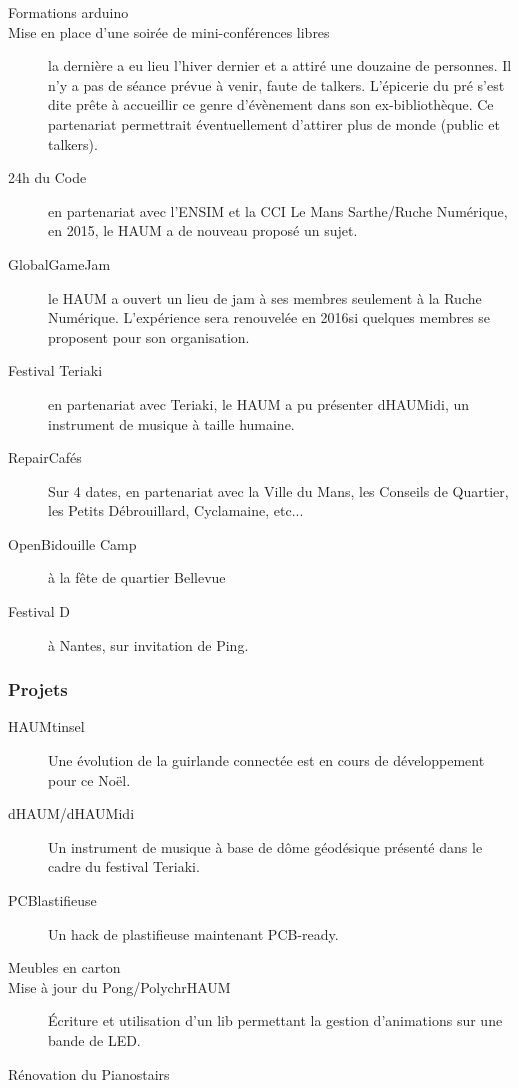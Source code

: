 \documentclass[11pt]{article}
\begin{document}
\begin{description}
    \item[Formations arduino]
    \item[Mise en place d'une soirée de mini-conférences libres] la dernière a eu lieu l'hiver dernier et a attiré une
		douzaine de personnes. Il n'y a pas de séance prévue à venir, faute de talkers. L'épicerie du pré s'est dite prête à accueillir ce genre d'évènement dans son ex-bibliothèque. Ce partenariat permettrait éventuellement d'attirer plus de monde (public et talkers).
    \item[24h du Code] en partenariat avec l'ENSIM et la CCI Le Mans Sarthe/Ruche Numérique, en 2015, le HAUM a de nouveau proposé un sujet.
	\item[GlobalGameJam] le HAUM a ouvert un lieu de jam à ses membres seulement à la Ruche Numérique. L'expérience sera renouvelée en 2016si quelques membres se proposent pour son organisation.
    \item[Festival Teriaki] en partenariat avec Teriaki, le HAUM a pu présenter dHAUMidi, un instrument de musique à taille humaine.
	\item[RepairCafés] Sur 4 dates, en partenariat avec la Ville du Mans, les Conseils de Quartier, les Petits
		Débrouillard, Cyclamaine, etc...
	\item[OpenBidouille Camp] à la fête de quartier Bellevue
	\item[Festival D] à Nantes, sur invitation de Ping.
\end{description}

\subsubsection{Projets}
\label{ssec:projects}

\begin{description}
	\item[HAUMtinsel] Une évolution de la guirlande connectée est en cours de développement pour ce Noël.
	\item[dHAUM/dHAUMidi] Un instrument de musique à base de dôme géodésique présenté dans le cadre du festival Teriaki.
	\item[PCBlastifieuse] Un hack de plastifieuse maintenant PCB-ready.
	\item[Meubles en carton]
	\item[Mise à jour du Pong/PolychrHAUM] Écriture et utilisation d'un lib permettant la gestion d'animations sur une bande de LED.
	\item[Rénovation du Pianostairs]
\end{description}
\end{document}
